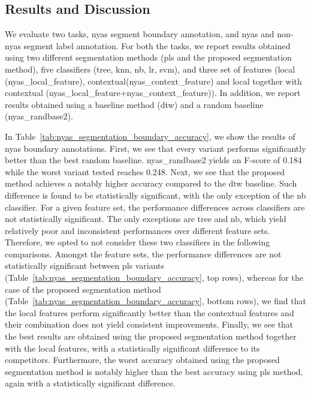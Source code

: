 {\subsection{Results and Discussion}
\label{sec:preprocessing_nyas_segmentation_results_and_discussion}

We evaluate two tasks, \gls{nyas} segment boundary annotation, and \gls{nyas} and non-\gls{nyas} segment label annotation. For both the tasks, we report results obtained using two different segmentation methods (\gls{pls} and the proposed segmentation method), five classifiers (\acrshort{tree}, \gls{knn}, \gls{nb}, \gls{lr}, \gls{svm}), and three set of features (local (\acrshort{nyas_local_feature}), contextual(\acrshort{nyas_context_feature}) and local together with contextual (\acrshort{nyas_local_feature}+\acrshort{nyas_context_feature})). In addition, we report results obtained using a baseline method (\acrshort{dtw}) and a random baseline (\acrshort{nyas_randbase2}).

In Table~\ref{tab:nyas_segmentation_boundary_accuracy}, we show the results of \gls{nyas} boundary annotations. First, we see that every variant performs significantly better than the best random baseline. \acrshort{nyas_randbase2} yields an F-score of 0.184 while the worst variant tested reaches 0.248. Next, we see that the proposed method achieves a notably higher accuracy compared to the \acrshort{dtw} baseline. Such difference is found to be statistically significant, with the only exception of the \acrshort{nb} classifier. For a given feature set, the performance differences across classifiers are not statistically significant. The only exceptions are \acrshort{tree} and \acrshort{nb}, which yield relatively poor and inconsistent performances over different feature sets. Therefore, we opted to not consider these two classifiers in the following comparisons. Amongst the feature sets, the performance differences are not statistically significant between \gls{pls} variants (Table~\ref{tab:nyas_segmentation_boundary_accuracy}, top rows), whereas for the case of the proposed segmentation method (Table~\ref{tab:nyas_segmentation_boundary_accuracy}, bottom rows), we find that the local features perform significantly better than the contextual features and their combination does not yield consistent improvements. Finally, we see that the best results are obtained using the proposed segmentation method together with the local features, with a statistically significant difference to its competitors. Furthermore, the worst accuracy obtained using the proposed segmentation method is notably higher than the best accuracy using \gls{pls} method, again with a statistically significant difference.

}
